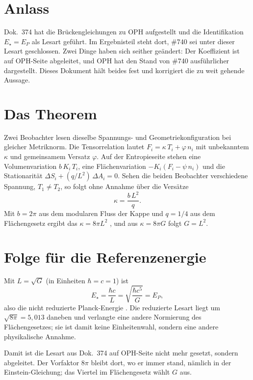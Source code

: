 \section{Anlass}

Dok.~374 hat die Brückengleichungen zu OPH aufgestellt und die Identifikation
$E_\star=E_P$ als Lesart geführt. Im Ergebnisteil steht dort, \#740 sei unter
dieser Lesart geschlossen. Zwei Dinge haben sich seither geändert: Der
Koeffizient ist auf OPH-Seite abgeleitet, und OPH hat den Stand von \#740
ausführlicher dargestellt. Dieses Dokument hält beides fest und korrigiert die
zu weit gehende Aussage.

\section{Das Theorem \QM}

Zwei Beobachter lesen dieselbe Spannungs- und Geometriekonfiguration bei
gleicher Metriknorm. Die Tensorrelation lautet $F_i=\kappa\,T_i+\varphi\,n_i$
mit unbekanntem $\kappa$ und gemeinsamem Versatz $\varphi$. Auf der
Entropieseite stehen eine Volumenvariation $b\,K_i\,T_i$, eine
Flächenvariation $-K_i(F_i-\psi\,n_i)$ und die Stationarität
$\Delta S_i+(q/L^2)\,\Delta A_i=0$. Sehen die beiden Beobachter verschiedene
Spannung, $T_1\neq T_2$, so folgt ohne Annahme über die Versätze
\begin{equation}
  \kappa=\frac{b\,L^2}{q}.
\end{equation}
Mit $b=2\pi$ aus dem modularen Fluss der Kappe und $q=1/4$ aus dem
Flächengesetz ergibt das $\kappa=8\pi L^2$ \KM, und aus $\kappa=8\pi G$ folgt
$G=L^2$.

\section{Folge für die Referenzenergie}

Mit $L=\sqrt G$ (in Einheiten $\hbar=c=1$) ist
\begin{equation}
  E_\star=\frac{\hbar c}{L}=\sqrt{\frac{\hbar c^5}{G}}=E_P ,
\end{equation}
also die nicht reduzierte Planck-Energie \BM. Die reduzierte Lesart liegt um
$\sqrt{8\pi}=5{,}013$ daneben und verlangte eine andere Normierung des
Flächengesetzes; sie ist damit keine Einheitenwahl, sondern eine andere
physikalische Annahme.

Damit ist die Lesart aus Dok.~374 auf OPH-Seite nicht mehr gesetzt, sondern
abgeleitet. Der Vorfaktor $8\pi$ bleibt dort, wo er immer stand, nämlich in
der Einstein-Gleichung; das Viertel im Flächengesetz wählt $G$ aus.

